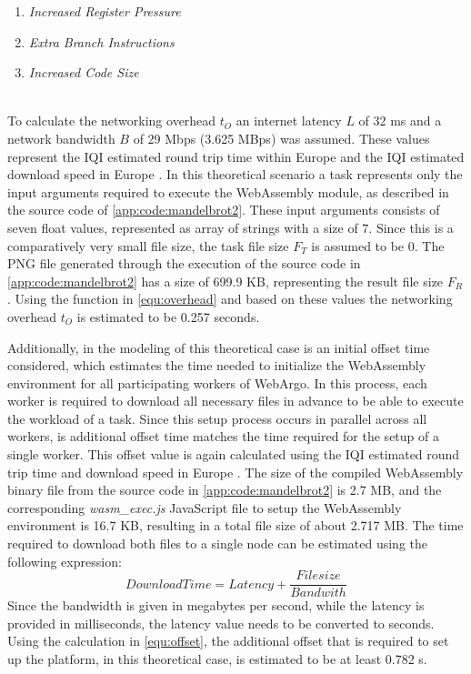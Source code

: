 \begin{enumerate}
  \item \emph{Increased Register Pressure}
  \item \emph{Extra Branch Instructions}
  \item \emph{Increased Code Size}
\end{enumerate}
~\\
To calculate the networking overhead $t_{O}$ an internet latency $L$ of 32 ms \cite{backend:latency} and a network bandwidth $B$ of 29 Mbps (3.625 MBps) \cite{backend:latency} was assumed. These values represent the \ac{IQI} estimated round trip time within Europe \cite{backend:latency} and the \ac{IQI} estimated download speed in Europe \cite{backend:latency}. In this theoretical scenario a task represents only the input arguments required to execute the WebAssembly module, as described in the source code of \autoref{app:code:mandelbrot2}. These input arguments consists of seven float values, represented as array of strings with a size of $7$. Since this is a comparatively very small file size, the task file size $F_{T}$ is assumed to be $0$. The \acs{PNG} file generated through the execution of the source code in \autoref{app:code:mandelbrot2} has a size of 699.9 KB, representing the result file size $F_{R}$. Using the function in \eqref{equ:overhead} and based on these values the networking overhead $t_{O}$ is estimated to be 0.257 seconds.

Additionally, in the modeling of this theoretical case is an initial offset time considered, which estimates the time needed to initialize the WebAssembly environment for all participating workers of WebArgo. In this process, each worker is required to download all necessary files in advance to be able to execute the workload of a task. Since this setup process occurs in parallel across all workers, is additional offset time matches the time required for the setup of a single worker. This offset value is again calculated using the \ac{IQI} estimated round trip time and download speed in Europe \cite{backend:latency}. The size of the compiled WebAssembly binary file from the source code in \autoref{app:code:mandelbrot2} is 2.7 MB, and the corresponding \emph{wasm\_exec.js} JavaScript file to setup the WebAssembly environment is 16.7 KB, resulting in a total file size of about 2.717 MB. The time required to download both files to a single node can be estimated using the following expression:
\begin{equation}
  DownloadTime = Latency + \frac{Filesize}{Bandwith} 
  \label{equ:offset}
\end{equation}
Since the bandwidth is given in megabytes per second, while the latency is provided in milliseconds, the latency value needs to be converted to seconds. Using the calculation in \eqref{equ:offset}, the additional offset that is required to set up the platform, in this theoretical case, is estimated to be at least 0.782 s.

